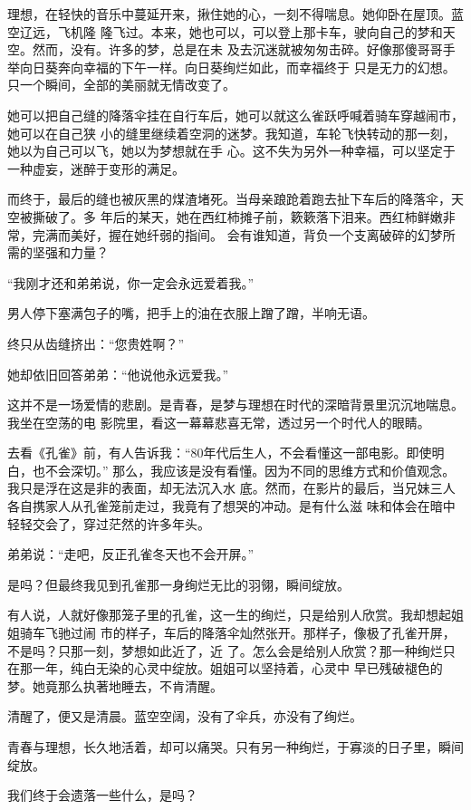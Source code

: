 		理想，在轻快的音乐中蔓延开来，揪住她的心，一刻不得喘息。她仰卧在屋顶。蓝空辽远，飞机隆
	隆飞过。本来，她也可以，可以登上那卡车，驶向自己的梦和天空。然而，没有。许多的梦，总是在未
	及去沉迷就被匆匆击碎。好像那傻哥哥手举向日葵奔向幸福的下午一样。向日葵绚烂如此，而幸福终于
	只是无力的幻想。只一个瞬间，全部的美丽就无情改变了。

		她可以把自己缝的降落伞挂在自行车后，她可以就这么雀跃呼喊着骑车穿越闹市，她可以在自己狭
	小的缝里继续着空洞的迷梦。我知道，车轮飞快转动的那一刻，她以为自己可以飞，她以为梦想就在手
	心。这不失为另外一种幸福，可以坚定于一种虚妄，迷醉于变形的满足。

		而终于，最后的缝也被灰黑的煤渣堵死。当母亲踉跄着跑去扯下车后的降落伞，天空被撕破了。多
	年后的某天，她在西红柿摊子前，簌簌落下泪来。西红柿鲜嫩非常，完满而美好，握在她纤弱的指间。
	会有谁知道，背负一个支离破碎的幻梦所需的坚强和力量？

		“我刚才还和弟弟说，你一定会永远爱着我。”

		男人停下塞满包子的嘴，把手上的油在衣服上蹭了蹭，半响无语。

		终只从齿缝挤出：“您贵姓啊？”

		她却依旧回答弟弟：“他说他永远爱我。”

		这并不是一场爱情的悲剧。是青春，是梦与理想在时代的深暗背景里沉沉地喘息。我坐在空荡的电
	影院里，看这一幕幕悲喜无常，透过另一个时代人的眼睛。

		去看《孔雀》前，有人告诉我：“80年代后生人，不会看懂这一部电影。即使明白，也不会深切。”
	那么，我应该是没有看懂。因为不同的思维方式和价值观念。我只是浮在这是非的表面，却无法沉入水
	底。然而，在影片的最后，当兄妹三人各自携家人从孔雀笼前走过，我竟有了想哭的冲动。是有什么滋
	味和体会在暗中轻轻交会了，穿过茫然的许多年头。

		弟弟说：“走吧，反正孔雀冬天也不会开屏。”

		是吗？但最终我见到孔雀那一身绚烂无比的羽翎，瞬间绽放。

		有人说，人就好像那笼子里的孔雀，这一生的绚烂，只是给别人欣赏。我却想起姐姐骑车飞驰过闹
	市的样子，车后的降落伞灿然张开。那样子，像极了孔雀开屏，不是吗？只那一刻，梦想如此近了，近
	了。怎么会是给别人欣赏？那一种绚烂只在那一年，纯白无染的心灵中绽放。姐姐可以坚持着，心灵中
	早已残破褪色的梦。她竟那么执著地睡去，不肯清醒。

		清醒了，便又是清晨。蓝空空阔，没有了伞兵，亦没有了绚烂。

		青春与理想，长久地活着，却可以痛哭。只有另一种绚烂，于寡淡的日子里，瞬间绽放。

		我们终于会遗落一些什么，是吗？

